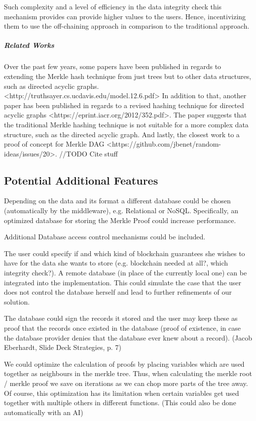 Such complexity and a level of efficiency in the data integrity check this mechanism provides can provide higher values to the users. Hence, incentivizing them to use the off-chaining approach in comparison to the traditional approach.

\subparagraph{Related Works}
Over the past few years, some papers have been published in regards to extending the Merkle hash technique from just trees but to other data structures, such as directed acyclic graphs. <http://truthsayer.cs.ucdavis.edu/model.12.6.pdf> In addition to that, another paper has been published in regards to a revised hashing technique for directed acyclic graphs <https://eprint.iacr.org/2012/352.pdf>. The paper suggests that the traditional Merkle hashing technique is not suitable for a more complex data structure, such as the directed acyclic graph. And lastly, the closest work to a proof of concept for Merkle DAG <https://github.com/jbenet/random-ideas/issues/20>.  //TODO Cite stuff

\subsection{Potential Additional Features}
Depending on the data and its format a different database could be chosen (automatically by the middleware), e.g. Relational or NoSQL. Specifically, an optimized database for storing the Merkle Proof could increase performance.

Additional Database access control mechanisms could be included.

The user could specify if and which kind of blockchain guarantees she wishes to have for the data she wants to store (e.g. blockchain needed at all?, which integrity check?).
A remote database (in place of the currently local one) can be integrated into the implementation. This could simulate the case that the user does not control the database herself and lead to further refinements of our solution.

The database could sign the records it stored and the user may keep these as proof that the records once existed in the database (proof of existence, in case the database provider denies that the database ever knew about a record). (Jacob Eberhardt, Slide Deck Strategies, p. 7)

We could optimize the calculation of proofs by placing variables which are used together as neighbours in the merkle tree. Thus, when calculating the merkle root / merkle proof we save on iterations as we can chop more parts of the tree away. Of course, this optimization has its limitation when certain variables get used together with multiple others in different functions. (This could also be done automatically with an AI)


\newpage
